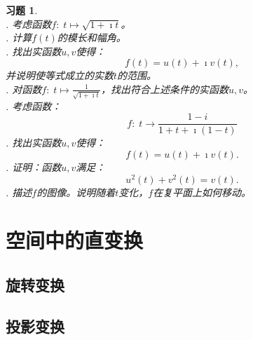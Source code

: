 \documentclass[12pt,UTF8]{ctexbook}
\theoremstyle{definition}
\theoremstyle{plain}
\newtheorem{sk}{思考}[section]
\newtheorem{xt}{习题}[section]
\begin{document}
\begin{xt}
    \mbox{} \\
    . 考虑函数$f:\; t\mapsto \sqrt{1 + \imath t}$。\\
    . 计算$f(t)$的模长和幅角。\\
    . 找出实函数$u,v$使得：
    $$ f(t) = u(t) + \imath v(t), $$
    \indent 并说明使等式成立的实数$t$的范围。\\
    . 对函数$f:\;t\mapsto \frac{1}{\sqrt{1 + \imath t}}$，找出符合上述条件的实函数$u,v$。\\
    . 考虑函数：
    $$ f:\; t \to \frac{1 - i}{1 + t + \imath(1 - t)}$$
    . 找出实函数$u,v$使得：
    $$ f(t) = u(t) + \imath v(t). $$
    . 证明：函数$u,v$满足：
    $$ u^2(t) + v^2(t) = v(t).$$
    . 描述$f$的图像。说明随着$t$变化，$f$在复平面上如何移动。

\end{xt}





\chapter{空间中的直变换}

\section{旋转变换}

\section{投影变换}
\end{document}
